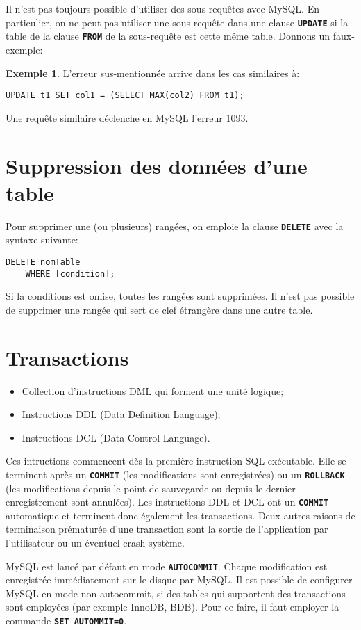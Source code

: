 \documentclass[a4paper, 12pt]{report}
\newcommand{\textSQL}[1]{\texttt{\textbf{#1}}}
\theoremstyle{definition} \newtheorem{ex}{Exemple}
\begin{document}
Il n'est pas toujours possible d'utiliser des sous-requêtes avec MySQL. En particulier, on ne peut pas utiliser une sous-requête dans une clause \textSQL{UPDATE} si la table de la clause \textSQL{FROM} de la sous-requête est cette même table. Donnons un faux-exemple:
\begin{ex}
L'erreur sus-mentionnée arrive dans les cas similaires à:
\begin{lstlisting}[frame=single]
UPDATE t1 SET col1 = (SELECT MAX(col2) FROM t1);
\end{lstlisting}
Une requête similaire déclenche en MySQL l'erreur 1093.
\end{ex}

\section{Suppression des données d'une table}
Pour supprimer une (ou plusieurs) rangées, on emploie la clause \textSQL{DELETE} avec la syntaxe suivante:
\begin{lstlisting}[frame=single]
DELETE nomTable
	WHERE [condition];
\end{lstlisting}
Si la conditions est omise, toutes les rangées sont supprimées. Il n'est pas possible de supprimer une rangée qui sert de clef étrangère dans une autre table.

\section{Transactions}
\begin{itemize}
\item Collection d'instructions DML qui forment une unité logique;
\item Instructions DDL (Data Definition Language);
\item Instructions DCL (Data Control Language).
\end{itemize}
Ces intructions commencent dès la première instruction SQL exécutable. Elle se terminent après un \textSQL{COMMIT} (les modifications sont enregistrées) ou un \textSQL{ROLLBACK} (les modifications depuis le point de sauvegarde ou depuis le dernier enregistrement sont annulées). Les instructions DDL et DCL ont un \textSQL{COMMIT} automatique et terminent donc également les transactions. Deux autres raisons de terminaison prématurée d'une transaction sont la sortie de l'application par l'utilisateur ou un éventuel crash système.

MySQL est lancé par défaut en mode \textSQL{AUTOCOMMIT}. Chaque modification est enregistrée immédiatement sur le disque par MySQL. Il est possible de configurer MySQL en mode non-autocommit, si des tables qui supportent des transactions sont employées (par exemple InnoDB, BDB). Pour ce faire, il faut employer la commande \textSQL{SET AUTOMMIT=0}.
\end{document}
